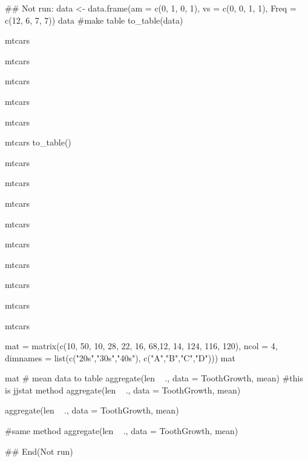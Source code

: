 \documentclass[a4paper]{book}
\begin{document}
\begin{Examples}
\begin{ExampleCode}
\#\# Not run: 
data <- data.frame(am = c(0, 1, 0, 1),
                   vs = c(0, 0, 1, 1),
                   Freq = c(12, 6, 7, 7))
data
#make  table
to_table(data)

mtcars %

mtcars %

mtcars %

mtcars %

mtcars %

mtcars %
to_table()%

mtcars %

mtcars %

mtcars %

mtcars %

mtcars %

mtcars %

mtcars %

mtcars %

mtcars %

mat = matrix(c(10, 50, 10, 28, 22, 16, 68,12, 14, 124, 116, 120),
ncol = 4,
dimnames = list(c("20s","30s","40s"),
                c("A","B","C","D")))
mat

mat  %
# mean data to table
aggregate(len ~ ., data = ToothGrowth, mean) %
#this is jjstat method
aggregate(len ~ ., data = ToothGrowth, mean) %

aggregate(len ~ ., data = ToothGrowth, mean) %

#same method
aggregate(len ~ ., data = ToothGrowth, mean) %


## End(Not run)
\end{ExampleCode}
\end{Examples}
\end{document}
